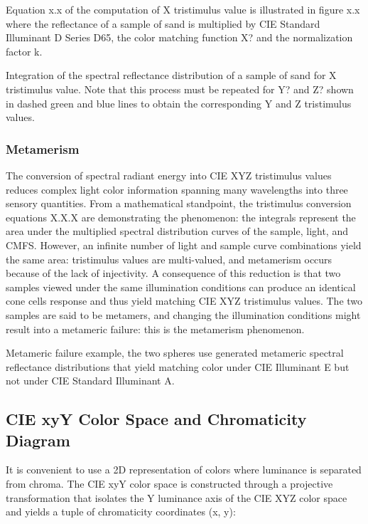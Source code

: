 Equation x.x of the computation of X tristimulus value is illustrated in figure x.x where the reflectance of a sample of sand is multiplied by CIE Standard Illuminant D Series D65, the color matching function X? and the normalization factor k.

Integration of the spectral reflectance distribution of a sample of sand for X tristimulus value. Note that this process must be repeated for Y? and Z? shown in dashed green and blue lines to obtain the corresponding Y and Z tristimulus values.

\subsubsection{Metamerism}%
\label{subsubsec:metamerism}

The conversion of spectral radiant energy into CIE XYZ tristimulus values reduces complex light color information spanning many wavelengths into three sensory quantities. From a mathematical standpoint, the tristimulus conversion equations X.X.X are demonstrating the phenomenon: the integrals represent the area under the multiplied spectral distribution curves of the sample, light, and CMFS. However, an infinite number of light and sample curve combinations yield the same area: tristimulus values are multi-valued, and metamerism occurs because of the lack of injectivity. A consequence of this reduction is that two samples viewed under the same illumination conditions can produce an identical cone cells response and thus yield matching CIE XYZ tristimulus values. The two samples are said to be metamers, and changing the illumination conditions might result into a metameric failure: this is the metamerism phenomenon.


Metameric failure example, the two spheres use generated metameric spectral reflectance distributions that yield matching color under CIE Illuminant E but not under CIE Standard Illuminant A.

\subsection{CIE xyY Color Space and Chromaticity Diagram}%
\label{subsec:cie-xyy-color-space-and-chromaticity-diagram}

It is convenient to use a 2D representation of colors where luminance is separated from chroma. The CIE xyY color space is constructed through a projective transformation that isolates the Y luminance axis of the CIE XYZ color space and yields a tuple of chromaticity coordinates (x, y):

